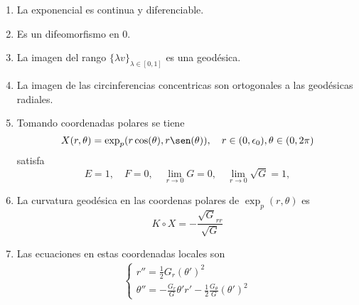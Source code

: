 \begin{prop}
  \begin{enumerate}[label=(\roman*)]
    \item La exponencial es continua y diferenciable.
    \item Es un difeomorfismo en $0$.
    \item La imagen del rango $\{ \lambda v \}_{\lambda \in [0,1]}$ es una geodésica.
    \item La imagen de las circinferencias concentricas son ortogonales a las geodésicas radiales.
    \item Tomando coordenadas polares se tiene 
      \[ 
        X(r,\theta) = \exp_{p} (r \cos(\theta), r \sen(\theta)), \quad r \in (0, \epsilon_{0}), \theta \in (0, 2 \pi)
      \] 
      satisfa
      \[ 
        E = 1, \quad F = 0, \quad \lim_{r \to 0} G = 0, \quad \lim_{r \to 0} \sqrt{G} = 1,
      \] 
    \item La curvatura geodésica en las coordenas polares de $\exp_{p}(r,\theta)$ es 
      \[ 
        K \circ X = -\frac{\sqrt{G}_{r r}}{\sqrt{G}} 
      \] 
    \item Las ecuaciones en estas coordenadas locales son
      \[ 
        \begin{aligned}
          \begin{cases}
            r'' = \frac{1}{2}G_{r}(\theta')^{2} \\
            \theta'' = - \frac{G_{r}}{G} \theta' r' - \frac{1}{2} \frac{G_{\theta}}{G}(\theta')^{2}
          \end{cases}
        \end{aligned} 
      \] 
  \end{enumerate}
\end{prop}
